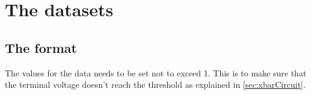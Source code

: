 \section{The datasets}\label{sec:dataset}

\subsection{The format}

The values for the data needs to be set not to exceed 1. This is to make sure that the terminal voltage doesn't reach the threshold as explained in \cref{sec:xbarCircuit}.
